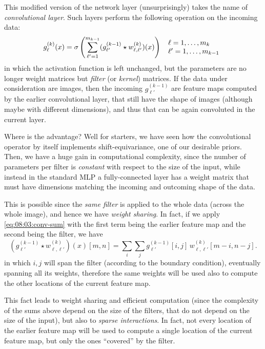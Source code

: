 This modified version of the network layer (unsurprisingly) takes the name of \emph{convolutional layer}. Such layers perform the following operation on the incoming data:
\begin{equation}
    g^{(k)}_\ell(x) = \sigma\left( \displaystyle\sum_{\ell'=1}^{m_{k-1}} (g^{(k-1)}_{\ell'} \star w^{(k)}_{\ell,\ell'}) (x) \right) \hspace{1.5mm} 
    \begin{array}{l}
    \ell = 1, \hdots, m_k\\
     \ell' = 1, \hdots, m_{k-1}\\
    \end{array}
\end{equation}
in which the activation function is left unchanged, but the parameters are no longer weight matrices but \textit{filter} (or \textit{kernel}) matrices. If the data under consideration are images, then the incoming $g^{(k-1)}_{\ell'}$ are feature maps computed by the earlier convolutional layer, that still have the shape of images (although maybe with different dimensions), and thus that can be again convoluted in the current layer.

Where is the advantage? Well for starters, we have seen how the convolutional operator by itself implements shift-equivariance, one of our desirable priors. Then, we have a huge gain in computational complexity, since the number of parameters per filter is \emph{constant} with respect to the size of the input, while instead in the standard MLP a fully-connected layer has a weight matrix that must have dimensions matching the incoming and outcoming shape of the data. 

This is possible since the \textit{same filter} is applied to the whole data (across the whole image), and hence we have \emph{weight sharing}. In fact, if we apply \cref{eq:08:03:conv-sum} with the first term being the earlier feature map and the second being the filter, we have
\begin{equation}
    (g^{(k-1)}_{\ell'} \star w^{(k)}_{\ell,\ell'}) (x) [m, n] = \sum_i\sum_j  g^{(k-1)}_{\ell'} [i,j] \, w^{(k)}_{\ell,\ell'}[m-i,n-j].
\end{equation}
in which $i, j$ will span the filter (according to the boundary condition), eventually spanning all its weights, therefore the same weights will be used also to compute the other locations of the current feature map.

This fact leads to weight sharing and efficient computation (since the complexity of the sums above depend on the size of the filters, that do not depend on the size of the input), but also to \emph{sparse interactions}. In fact, not every location of the earlier feature map will be used to compute a single location of the current feature map, but only the ones ``covered'' by the filter.

